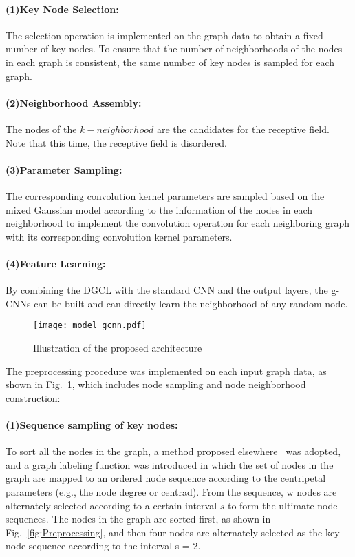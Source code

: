 \documentclass[11pt]{article}
\begin{document}
\paragraph{(1)Key Node Selection:} The selection operation is implemented on the graph data to obtain a fixed number of key nodes. To ensure that the number of neighborhoods of the nodes in each graph is consistent, the same number of key nodes is sampled for each graph.

\paragraph{(2)Neighborhood Assembly:} The nodes of the $k-neighborhood$ are the candidates for the receptive field. Note that this time, the receptive field is disordered.


\paragraph{(3)Parameter Sampling:} The corresponding convolution kernel parameters are sampled based on the mixed Gaussian model according to the information of the nodes in each neighborhood to implement the convolution operation for each neighboring graph with its corresponding convolution kernel parameters.

\paragraph{(4)Feature Learning:} By combining the DGCL with the standard CNN and the output layers, the g-CNNs can be built and can directly learn the neighborhood of any random node.


\begin{figure}
\vspace{-0.1in}
\centering
\texttt{[image: model\_gcnn.pdf]}
\vspace{-0.1in}
\caption{Illustration of the proposed architecture}\label{fig:model_gcnn}
\vspace{-0.2in}
\end{figure}

The preprocessing procedure was implemented on each input graph data, as shown in Fig.~\ref{fig:model_gcnn}, which includes node sampling and node neighborhood construction:

\paragraph{(1)Sequence sampling of key nodes:} To sort all the nodes in the graph, a method proposed elsewhere~\cite{Niepert2016Learning_10} was adopted, and a graph labeling function was introduced in which the set of nodes in the graph are mapped to an ordered node sequence according to the centripetal parameters  (e.g., the node degree or centrad). From the sequence, w nodes are alternately selected according to a certain interval $s$ to form the ultimate node sequences. The nodes in the graph are sorted first, as shown in Fig.~\ref{fig:Preprocessing}, and then four nodes are alternately selected as the key node sequence according to the interval s = 2.
\end{document}
